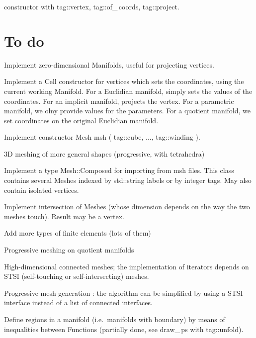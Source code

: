 \documentclass[a4paper]{scrreprt}
\newcommand\azul[1]{\textcolor{nova}{#1}}
\newcommand\verm[1]{\textcolor{manif}{#1}}
\renewcommand\tt{\normalfont\ttfamily}
\begin{document}
\noindent {\small\tt\verm{Cell}} constructor with {\small\tt\textcolor{tag}{tag}::vertex},
{\small\tt\textcolor{tag}{tag}::of\_\,coords}, {\small\tt\textcolor{tag}{tag}::project}.
          

\section*{To do}

Implement zero-dimensional {\small\tt\verm{Manifold}}s, useful for projecting vertices.

Implement a {\small\tt\verm{Cell}} constructor for vertices which sets the coordinates,
using the current working {\small\tt\verm{Manifold}}.
For a Euclidian manifold, simply sets the values of the coordinates.
For an implicit manifold, projects the vertex.
For a parametric manifold, we olny provide values for the parameters.
For a quotient manifold, we set coordinates on the original Euclidian manifold.

\noindent Implement constructor {\small\tt\verm{Mesh}} {\small\tt \azul{msh}} {\small\tt (}
{\small\tt\textcolor{tag}{tag}::cube,} {\small\tt ...,} {\small\tt\textcolor{tag}{tag}::winding}
{\small\tt )}.

\noindent 3D meshing of more general shapes (progressive, with tetrahedra)

\noindent Implement a type {\small\tt\verm{Mesh}::Composed} for importing from 
{\small\tt msh} files.
This class contains several {\small\tt\verm{Mesh}}es indexed by {\small\tt std::string}
labels or by integer tags.
May also contain isolated vertices.

\noindent Implement intersection of {\small\tt\verm{Mesh}}es (whose dimension depends on the
way the two meshes touch).
Result may be a vertex.

\noindent Add more types of finite elements (lots of them)

\noindent Progressive meshing on quotient manifolds

\noindent High-dimensional connected meshes; the implementation of iterators depends
on STSI (self-touching or self-intersecting) meshes.

\noindent Progressive mesh generation : the algorithm can be simplified by using
a STSI interface instead of a list of connected interfaces.

\noindent Define regions in a manifold (i.e.\ manifolds with boundary) by means of
inequalities between {\small\tt\verm{Function}}s (partially done, see {\small\tt draw\_\,ps}
with {\small\tt\textcolor{tag}{tag}::unfold}).
\end{document}
